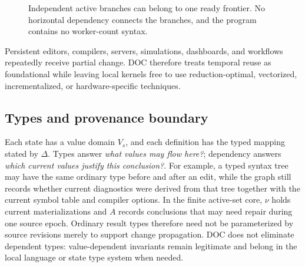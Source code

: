 \iffullvisuals
\begin{figure}[t]
\centering
{}
\caption{Independent active branches can belong to one ready frontier. No horizontal dependency connects the branches, and the program contains no worker-count syntax.}\label{fig:frontier-parallelism}
\end{figure}
\fi

Persistent editors, compilers, servers, simulations, dashboards, and workflows repeatedly receive partial change. DOC therefore treats temporal reuse as foundational while leaving local kernels free to use reduction-optimal, vectorized, incrementalized, or hardware-specific techniques.

\subsection{Types and provenance boundary}
Each state has a value domain $V_s$, and each definition has the typed mapping stated by $\Delta$. Types answer \emph{what values may flow here?}; dependency answers \emph{which current values justify this conclusion?}. For example, a typed syntax tree may have the same ordinary type before and after an edit, while the graph still records whether current diagnostics were derived from that tree together with the current symbol table and compiler options. In the finite active-set core, $\nu$ holds current materializations and $A$ records conclusions that may need repair during one source epoch. Ordinary result types therefore need not be parameterized by source revisions merely to support change propagation. DOC does not eliminate dependent types: value-dependent invariants remain legitimate and belong in the local language or state type system when needed.

